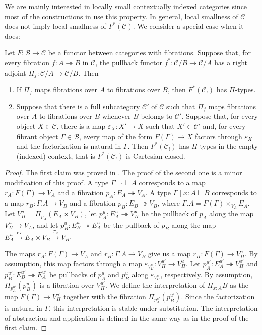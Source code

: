 \documentclass[reqno]{amsart}
\theoremstyle{definition}
\theoremstyle{remark}
\newcommand{\fs}[1]{\mathrm{#1}}
\newcommand{\scat}[1]{\mathcal{#1}}
\numberwithin{figure}{section}
\begin{document}
We are mainly interested in locally small contextually indexed categories since most of the constructions in \cite{indexed-tt} use this property.
In general, local smallness of $\scat{C}$ does not imply local smallness of $F^*(\scat{C})$.
We consider a special case when it does:

\begin{lem}
Let $F : \scat{B} \to \scat{C}$ be a functor between categories with fibrations.
Suppose that, for every fibration $f : A \twoheadrightarrow B$ in $\scat{C}$, the pullback functor $f^* : \scat{C}/B \to \scat{C}/A$ has a right adjoint $\Pi_f : \scat{C}/A \to \scat{C}/B$.
Then
\begin{enumerate}
\item If $\Pi_f$ maps fibrations over $A$ to fibrations over $B$, then $F^*(\scat{C}_!)$ has $\Pi$-types.
\item Suppose that there is a full subcategory $\scat{C}'$ of $\scat{C}$ such that $\Pi_f$ maps fibrations over $A$ to fibrations over $B$ whenever $B$ belongs to $\scat{C}'$.
Suppose that, for every object $X \in \scat{C}$, there is a map $\varepsilon_X : X' \to X$ such that $X' \in \scat{C}'$ and,
for every fibrant object $\Gamma \in \scat{B}$, every map of the form $F(\Gamma) \to X$ factors through $\varepsilon_X$ and the factorization is natural in $\Gamma$.
Then $F^*(\scat{C}_!)$ has $\Pi$-types in the empty (indexed) context, that is $F^*(\scat{C}_!)$ is Cartesian closed.
\end{enumerate}
\end{lem}
\begin{proof}
The first claim was proved in \cite{local-universes}.
The proof of the second one is a minor modification of this proof.
A type $\Gamma \mid \cdot \vdash A$ corresponds to a map $r_A : F(\Gamma) \to V_A$ and a fibration $p_A : E_A \twoheadrightarrow V_A$.
A type $\Gamma \mid x : A \vdash B$ corresponds to a map $r_B : \Gamma.A \to V_B$ and a fibration $p_B : E_B \twoheadrightarrow V_B$, where $\Gamma.A = F(\Gamma) \times_{V_A} E_A$.
Let $V_\Pi^u = \Pi_{p_A}(E_A \times V_B)$, let $p_A^u : E_A^u \twoheadrightarrow V_\Pi^u$ be the pullback of $p_A$ along the map $V_\Pi^u \to V_A$,
and let $p_B^u : E_B^u \twoheadrightarrow E_A^u$ be the pullback of $p_B$ along the map $E_A^u \xrightarrow{\fs{ev}} E_A \times V_B \xrightarrow{\pi_2} V_B$.

The maps $r_A : F(\Gamma) \to V_A$ and $r_B : \Gamma.A \to V_B$ give us a map $r_\Pi : F(\Gamma) \to V_\Pi^u$.
By assumption, this map factors through a map $\varepsilon_{V_\Pi^u} : V_\Pi^{u'} \to V_\Pi^u$.
Let $p_A^{u'} : E_A^{u'} \twoheadrightarrow V_\Pi^{u'}$ and $p_B^{u'} : E_B^{u'} \twoheadrightarrow E_A^{u'}$ be pullbacks of $p_A^u$ and $p_B^u$ along $\varepsilon_{V_\Pi^u}$, respectively.
By assumption, $\Pi_{p_A^{u'}}(p_B^{u'})$ is a fibration over $V_\Pi^{u'}$.
We define the interpretation of $\Pi_{x : A} B$ as the map $F(\Gamma) \to V_\Pi^{u'}$ together with the fibration $\Pi_{p_A^{u'}}(p_B^{u'})$.
Since the factorization is natural in $\Gamma$, this interpretation is stable under substitution.
The interpretation of abstraction and application is defined in the same way as in the proof of the first claim.
\end{proof}
\end{document}
